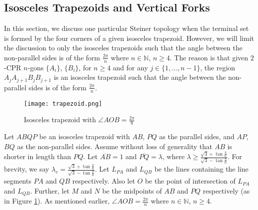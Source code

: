 
\subsection{Isosceles Trapezoids and Vertical Forks} \label{trapezoids}


In this section, we discuss one particular Steiner topology when the terminal set is  formed by the four corners of a given isosceles trapezoid. However, we will limit the discussion to only the isosceles trapezoids such that the angle between the non-parallel sides is of the form $\frac{2 \pi}n$ where $n \in \mathbb{N}$, $n \ge 4$. The reason is that given $2$-CPR $n$-gons $\{A_i\}$, $\{B_i\}$, for $n \geq 4$ and for any $j \in \{1,\ldots, n-1\}$, the region $A_jA_{j + 1}B_jB_{j + 1}$ is an isosceles trapezoid such that the angle between the non-parallel sides is of the form $\frac{2 \pi}n$.

\begin{figure}[h]
\centering
\texttt{[image: trapezoid.png]}
\caption{Isosceles trapezoid with $\angle AOB = \frac {2 \pi} 8$}
\label{trap_def}
\end{figure}

Let $ABQP$ be an isosceles trapezoid with $AB$, $PQ$ as the parallel sides, and $AP$, $BQ$ as the non-parallel sides. Assume without loss of generality that $AB$ is shorter in length than $PQ$. Let $\overline{AB} = 1$ and $\overline{PQ} = \lambda$, where $\lambda \geq \frac {\sqrt 3 + \tan{ \frac \pi n }} {\sqrt 3 - \tan{ \frac \pi n}} $. For brevity, we say $\lambda_v = \frac {\sqrt 3 + \tan{ \frac \pi n }} {\sqrt 3 - \tan{ \frac \pi n}}$. Let $L_{PA}$ and $L_{QB}$ be the lines containing the line segments $PA$ and $QB$ respectively. Also let $O$ be the point of intersection of $L_{PA}$ and $L_{QB}$. Further, let $M$ and $N$ be the midpoints of $AB$ and $PQ$ respectively (as in Figure \ref{trap_def}). As mentioned earlier, $\angle AOB = \frac{2 \pi}n$ where $n \in \mathbb{N}$, $n \ge 4$.






